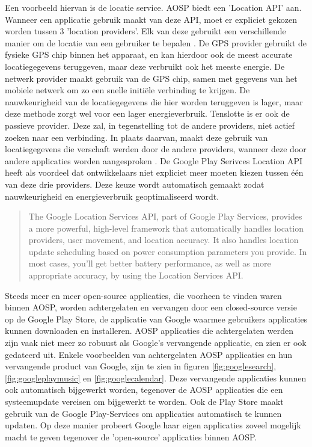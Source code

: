 Een voorbeeld hiervan is de locatie service. AOSP biedt een 'Location API' aan. Wanneer een applicatie gebruik maakt van deze API, moet er expliciet gekozen worden tussen 3 'location providers'. Elk van deze gebruikt een verschillende manier om de locatie van een gebruiker te bepalen \autocite{android_location-strategies}. De GPS provider gebruikt de fysieke GPS chip binnen het apparaat, en kan hierdoor ook de meest accurate locatiegegevens teruggeven, maar deze verbruikt ook het meeste energie. De netwerk provider maakt gebruik van de GPS chip, samen met gegevens van het mobiele netwerk om zo een snelle initiële verbinding te krijgen. De nauwkeurigheid van de locatiegegevens die hier worden teruggeven is lager, maar deze methode zorgt wel voor een lager energieverbruik. Tenslotte is er ook de passieve provider. Deze zal, in tegenstelling tot de andere providers, niet actief zoeken naar een verbinding. In plaats daarvan, maakt deze gebruik van locatiegegevens die verschaft werden door de andere providers, wanneer deze door andere applicaties worden aangesproken \autocite{idris_location-providers}. De Google Play Serivces Location API heeft als voordeel dat ontwikkelaars niet expliciet meer moeten kiezen tussen één van deze drie providers. Deze keuze wordt automatisch gemaakt zodat nauwkeurigheid en energieverbruik geoptimaliseerd wordt. \autocite{android_location-strategies}

\blockcquote{android_location-strategies}{
    The Google Location Services API, part of Google Play Services, provides a more powerful, high-level framework that automatically handles location providers, user movement, and location accuracy. It also handles location update scheduling based on power consumption parameters you provide. In most cases, you'll get better battery performance, as well as more appropriate accuracy, by using the Location Services API.
}

Steeds meer en meer open-source applicaties, die voorheen te vinden waren binnen AOSP, worden achtergelaten en vervangen door een closed-source versie op de Google Play Store, de applicatie van Google waarmee gebruikers applicaties kunnen downloaden en installeren. AOSP applicaties die achtergelaten werden zijn vaak niet meer zo robuust als Google's vervangende applicatie, en zien er ook gedateerd uit. Enkele voorbeelden van achtergelaten AOSP applicaties en hun vervangende product van Google, zijn te zien in figuren \ref{fig:googlesearch}, \ref{fig:googleplaymusic} en \ref{fig:googlecalendar}. Deze vervangende applicaties kunnen ook automatisch bijgewerkt worden, tegenover de AOSP applicaties die een systeemupdate vereisen om bijgewerkt te worden. Ook de Play Store maakt gebruik van de Google Play-Services om applicaties automatisch te kunnen updaten. Op deze manier probeert Google haar eigen applicaties zoveel mogelijk macht te geven tegenover de 'open-source' applicaties binnen AOSP. \autocite{amadeo_open-source}

